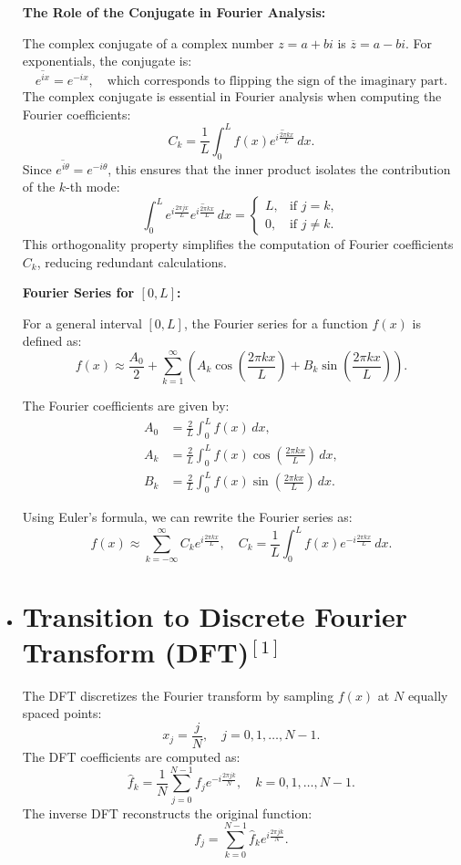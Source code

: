 \documentclass{article}
\begin{document}
\begin{itemize}
{\textbf{The Role of the Conjugate in Fourier Analysis:}

The complex conjugate of a complex number \( z = a + bi \) is \( \overline{z} = a - bi \). For exponentials, the conjugate is:
\[ \overline{e^{ix}} = e^{-ix}, \quad \text{which corresponds to flipping the sign of the imaginary part.} \]
The complex conjugate is essential in Fourier analysis when computing the Fourier coefficients:
\[ C_k = \frac{1}{L} \int_0^L f(x) \overline{e^{i \frac{2\pi k x}{L}}} \, dx. \]
Since \( \overline{e^{i \theta}} = e^{-i \theta} \), this ensures that the inner product isolates the contribution of the \( k \)-th mode:
\[
\int_0^L e^{i \frac{2\pi j x}{L}} \overline{e^{i \frac{2\pi k x}{L}}} \, dx = 
\begin{cases} 
L, & \text{if } j = k, \\
0, & \text{if } j \neq k.
\end{cases}
\]
This orthogonality property simplifies the computation of Fourier coefficients \( C_k \), reducing redundant calculations.

\textbf{Fourier Series for \([0, L]\):}

For a general interval \([0, L]\), the Fourier series for a function \( f(x) \) is defined as:
\[ f(x) \approx \frac{A_0}{2} + \sum_{k=1}^\infty \left( A_k \cos\left(\frac{2\pi k x}{L}\right) + B_k \sin\left(\frac{2\pi k x}{L}\right) \right). \]

The Fourier coefficients are given by:
\begin{align*}
A_0 &= \frac{2}{L} \int_0^L f(x) \, dx, \\
A_k &= \frac{2}{L} \int_0^L f(x) \cos\left(\frac{2\pi k x}{L}\right) \, dx, \\
B_k &= \frac{2}{L} \int_0^L f(x) \sin\left(\frac{2\pi k x}{L}\right) \, dx.
\end{align*}

Using Euler's formula, we can rewrite the Fourier series as:
\[ f(x) \approx \sum_{k=-\infty}^\infty C_k e^{i \frac{2\pi k x}{L}}, \quad C_k = \frac{1}{L} \int_0^L f(x) e^{-i \frac{2\pi k x}{L}} \, dx. \]


}
\item{ \section*{Transition to Discrete Fourier Transform (DFT)$^{[1]}$}
The DFT discretizes the Fourier transform by sampling \( f(x) \) at \( N \) equally spaced points:
\[ x_j = \frac{j}{N}, \quad j = 0, 1, \dots, N-1. \]
The DFT coefficients are computed as:
\[ \hat{f}_k = \frac{1}{N} \sum_{j=0}^{N-1} f_j e^{-i \frac{2\pi j k}{N}}, \quad k = 0, 1, \dots, N-1. \]
The inverse DFT reconstructs the original function:
\[ f_j = \sum_{k=0}^{N-1} \hat{f}_k e^{i \frac{2\pi j k}{N}}. \]

}
\end{itemize}
\end{document}
